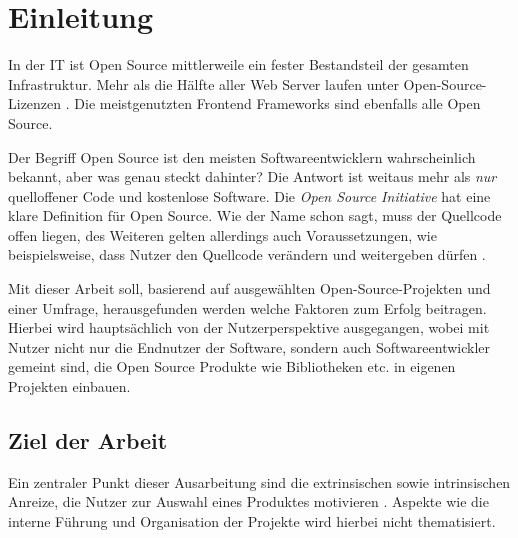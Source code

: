 \chapter{Einleitung}


In der IT ist Open Source mittlerweile ein fester Bestandsteil der gesamten Infrastruktur.
Mehr als die Hälfte aller Web Server laufen unter Open-Source-Lizenzen \cite{W3Techs_WebServer}.
Die meistgenutzten Frontend Frameworks sind ebenfalls alle Open Source. \cite{StackOverflowSurvey2021}


Der Begriff Open Source ist den meisten Softwareentwicklern wahrscheinlich bekannt,
aber was genau steckt dahinter? Die Antwort ist weitaus mehr als \textit{nur} quelloffener Code
und kostenlose Software.
Die \textit{Open Source Initiative} hat eine klare Definition für Open Source.
Wie der Name schon sagt, muss der Quellcode offen liegen, des Weiteren gelten allerdings auch
Voraussetzungen, wie beispielsweise, dass Nutzer den Quellcode verändern und weitergeben
dürfen \cite{OpenSourceDefinition}.


Mit dieser Arbeit soll, basierend auf ausgewählten Open-Source-Projekten und einer Umfrage,
herausgefunden werden welche Faktoren zum Erfolg beitragen.
Hierbei wird hauptsächlich von der Nutzerperspektive ausgegangen, wobei mit Nutzer nicht nur die
Endnutzer der Software, sondern auch Softwareentwickler gemeint sind, die Open Source Produkte wie
Bibliotheken etc. in eigenen Projekten einbauen.

\section{Ziel der Arbeit}


Ein zentraler Punkt dieser Ausarbeitung sind die extrinsischen sowie intrinsischen Anreize,
die Nutzer zur Auswahl eines Produktes motivieren \cite{midhaFactorsAffectingSuccess2012}. %
Aspekte wie die interne Führung und Organisation der Projekte wird hierbei nicht thematisiert.




